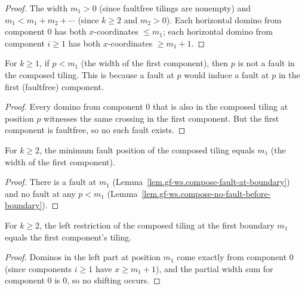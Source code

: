 \begin{proof}
\leanok
The width $m_1 > 0$ (since faultfree tilings are nonempty) and $m_1 < m_1 + m_2 + \cdots$
(since $k \ge 2$ and $m_2 > 0$). Each horizontal domino from component $0$
has both $x$-coordinates $\le m_1$; each horizontal domino from component $i \ge 1$
has both $x$-coordinates $\ge m_1 + 1$.
\end{proof}

\begin{lemma}
\label{lem.gf-ws.compose-no-fault-before-boundary}
\leanhelper
\leanok
For $k \ge 1$, if $p < m_1$ (the width of the first component), then $p$ is
not a fault in the composed tiling. This is because a fault at $p$ would
induce a fault at $p$ in the first (faultfree) component.
\end{lemma}

\begin{proof}
\leanok
Every domino from component $0$ that is also in the composed tiling at
position $p$ witnesses the same crossing in the first component. But the
first component is faultfree, so no such fault exists.
\end{proof}

\begin{lemma}
\label{lem.gf-ws.compose-minFault-eq}
\leanhelper
\leanok
For $k \ge 2$, the minimum fault position of the composed tiling equals $m_1$
(the width of the first component).
\end{lemma}

\begin{proof}
\leanok
There is a fault at $m_1$ (Lemma~\ref{lem.gf-ws.compose-fault-at-boundary})
and no fault at any $p < m_1$ (Lemma~\ref{lem.gf-ws.compose-no-fault-before-boundary}).
\end{proof}

\begin{lemma}
\label{lem.gf-ws.restrict-left-compose-eq}
\leanhelper
\leanok
For $k \ge 2$, the left restriction of the composed tiling at the first
boundary $m_1$ equals the first component's tiling.
\end{lemma}

\begin{proof}
\leanok
Dominos in the left part at position $m_1$ come exactly from component $0$
(since components $i \ge 1$ have $x \ge m_1 + 1$), and the partial width sum
for component $0$ is $0$, so no shifting occurs.
\end{proof}


